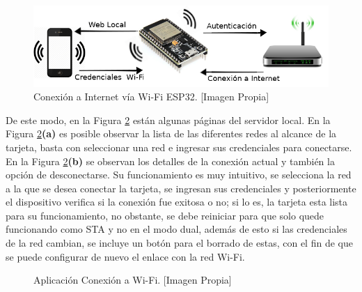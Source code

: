 \begin{figure}[H]
	\centering
	\caption[Conexión a Internet vía Wi-Fi ESP32.]{Conexión a Internet vía Wi-Fi ESP32.  [Imagen Propia]}
	\label{fig:conexion}
	\includegraphics[width=0.7\linewidth]{Imagenes/conexion}
\end{figure}


De este modo, en la Figura \ref{fig:wifi} están algunas páginas del servidor local. En la Figura \ref{fig:wifi}\textbf{(a)} es posible observar la lista de las diferentes redes al alcance de la tarjeta, basta con seleccionar una red e ingresar sus credenciales para conectarse. En la Figura \ref{fig:wifi}\textbf{(b)} se observan los detalles de la conexión actual y también la opción de desconectarse. Su funcionamiento es muy intuitivo, se selecciona la red a la que se desea conectar la tarjeta, se ingresan sus credenciales y posteriormente el dispositivo verifica si la conexión fue exitosa o no; si lo es, la tarjeta esta lista para su funcionamiento, no obstante, se debe reiniciar para que solo quede funcionando como STA y no en el modo dual, además de esto si las credenciales de la red cambian, se incluye un botón para el borrado de estas, con el fin de que se puede configurar de nuevo el enlace con la red Wi-Fi.

\begin{figure}[H]
	\centering
	\caption[Aplicación Conexión a Wi-Fi.]{Aplicación Conexión a Wi-Fi. [Imagen Propia]}
	\label{fig:wifi}
\end{figure}

